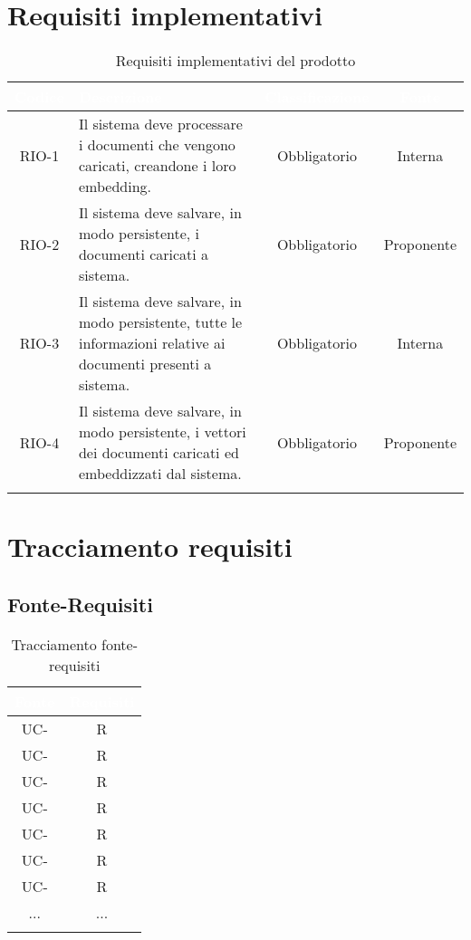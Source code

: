 \section{Requisiti implementativi}
\begingroup
\setlength{\tabcolsep}{10pt}
\renewcommand{\arraystretch}{1.5}
\begin{xltabular}{\textwidth}{| c | X | c | c |}
    \hline
     \textbf{\textcolor{white}{Codice}} & \textbf{\textcolor{white}{Descrizione}} & \textbf{\textcolor{white}{Classificazione}} & \textbf{\textcolor{white}{Fonte}}\\
    \hline
    \endhead
    RIO-1 & Il sistema deve processare i documenti che vengono caricati, creandone i loro embedding. & Obbligatorio & Interna\\
    \hline
    RIO-2 & Il sistema deve salvare, in modo persistente, i documenti caricati a sistema. & Obbligatorio & Proponente\\
    \hline
    RIO-3 & Il sistema deve salvare, in modo persistente, tutte le informazioni relative ai documenti presenti a sistema. & Obbligatorio & Interna\\
    \hline
    RIO-4 & Il sistema deve salvare, in modo persistente, i vettori dei documenti caricati ed embeddizzati dal sistema. & Obbligatorio & Proponente\\
    \hline
    
     \caption{Requisiti implementativi del prodotto}
    \label{tab:reqimp}
\end{xltabular}
\endgroup

\section{Tracciamento requisiti}

\subsection{Fonte-Requisiti}
\renewcommand{\arraystretch}{1.5}
\begin{xltabular}{\textwidth}{|c | c |}
    \hline
     \textbf{\textcolor{white}{Fonte}} & \textbf{\textcolor{white}{Requisiti}}\\
    \hline
    \endhead
    UC- & R  \\
    \hline
    UC- & R  \\
    \hline
    UC- & R \\
    \hline
    UC- & R \\
    \hline
    UC- & R \\
    \hline
    UC- & R \\
    \hline
    UC- & R \\
    \hline
    ... & ... \\
    \hline
     \caption{Tracciamento fonte-requisiti}
    \label{tab:riepilogo}
\end{xltabular}
